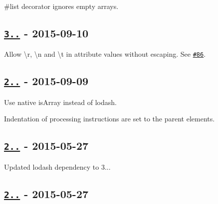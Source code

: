 \begin{DoxyItemize}
\item {\ttfamily \#list} decorator ignores empty arrays.
\end{DoxyItemize}

\subsection*{\href{https://github.com/oozcitak/xmlbuilder-js/compare/v2.6.5...v3.0.0}{\tt 3..} -\/ 2015-\/09-\/10}


\begin{DoxyItemize}
\item Allow {\ttfamily \textbackslash{}r}, {\ttfamily \textbackslash{}n} and {\ttfamily \textbackslash{}t} in attribute values without escaping. See \href{https://github.com/oozcitak/xmlbuilder-js/issues/86}{\tt \#86}.
\end{DoxyItemize}

\subsection*{\href{https://github.com/oozcitak/xmlbuilder-js/compare/v2.6.4...v2.6.5}{\tt 2..} -\/ 2015-\/09-\/09}


\begin{DoxyItemize}
\item Use native {\ttfamily is\+Array} instead of lodash.
\item Indentation of processing instructions are set to the parent element\textquotesingle{}s.
\end{DoxyItemize}

\subsection*{\href{https://github.com/oozcitak/xmlbuilder-js/compare/v2.6.3...v2.6.4}{\tt 2..} -\/ 2015-\/05-\/27}


\begin{DoxyItemize}
\item Updated lodash dependency to 3...
\end{DoxyItemize}

\subsection*{\href{https://github.com/oozcitak/xmlbuilder-js/compare/v2.6.2...v2.6.3}{\tt 2..} -\/ 2015-\/05-\/27}



